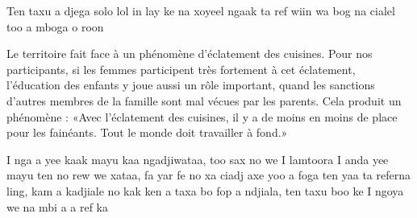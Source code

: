 \begin{paracol}{2}
  \switchcolumn %

  Ten taxu a djega solo lol in lay ke na xoyeel ngaak ta ref wiin wa bog na cialel too a mboga o roon

  \switchcolumn %

  Le territoire fait face à un phénomène d’éclatement des cuisines.  Pour nos participants, si les femmes participent très fortement à cet éclatement, l'éducation des enfants y joue aussi un rôle important, quand les sanctions d'autres membres de la famille sont mal vécues par les parents. Cela produit un phénomène : «Avec l’éclatement des cuisines, il y a de moins en moins de place pour les fainéants. Tout le monde doit travailler à fond.»

  \switchcolumn %
  I nga a yee kaak mayu kaa ngadjiwataa, too sax no we I lamtoora I anda yee mayu ten no rew we xataa, fa yar fe no xa ciadj axe yoo a foga ten yaa ta referna ling, kam a kadjiale no kak ken a taxa bo fop a ndjiala, ten taxu boo ke I ngoya we na mbi a a ref ka


\end{paracol}

